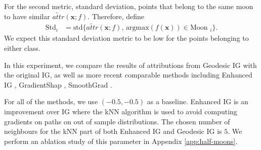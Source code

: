 For the second metric, standard deviation, points that belong to the same moon to have similar $\widetilde{attr}(\textbf{x}; f)$. Therefore, define
\begin{equation}
\begin{split}
    \textrm{Std}_i &= \textrm{std}\{\widetilde{attr}(\textbf{x}; f), \, \textrm{argmax}(f(\textbf{x})) \in \textrm{Moon }_i\}.
\end{split}
\label{eq:moons-std}
\end{equation}
We expect this standard deviation metric to be low for the points belonging to either class. 

In this experiment, we compare the results of attributions from Geodesic IG with the original IG, as well as more recent comparable methods including Enhanced IG \citep{jha2020enhanced}, GradientShap \citep{lundberg2017unified}, SmoothGrad \citep{smilkov2017smoothgrad}.

For all of the methods, we use $(-0.5, -0.5)$ as a baseline. Enhanced IG is an improvement over IG where the kNN algorithm is used to avoid computing gradients on paths on out of sample distributions. The chosen number of neighbours for the kNN part of both Enhanced IG and Geodesic IG is $5$. We perform an ablation study of this parameter in Appendix \ref{app:half-moons}. 

\begin{table}[t]
	\centering
	\caption{Evaluation of different attribution methods on a half-moons dataset with Gaussian noise $\mathcal{N}(0, 0.2)$. The results over 5 different seeds are averaged, with the corresponding standard deviation in brackets. We present in Appendix \ref{app:half-moons} more results with different amounts of Gaussian noise.}
	\label{tab:results_moons_2}
\end{table}

